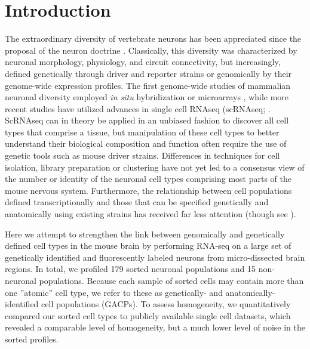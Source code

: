 \section*{Introduction}

The extraordinary diversity of vertebrate neurons has been appreciated since the proposal of the neuron doctrine \citep{Cajal_1888}. Classically, this diversity was characterized by neuronal morphology, physiology, and circuit connectivity, but increasingly, defined genetically through driver and reporter strains \citep{Gong_2003; Madisen_2009; Taniguchi_2011; Shima_2016} or genomically by their genome-wide expression profiles. The first genome-wide studies of mammalian neuronal diversity employed \textit{in situ} hybridization \citep{Lein_2006} or microarrays \citep{Sugino_2005; Doyle_2008}, while more recent studies have utilized advances in single cell RNAseq (scRNAseq; \citep{Zeisel_2015; Zeisel_2018; Tasic_2016; Tasic_2018; Paul_2017}. ScRNAseq can in theory be applied in an unbiased fashion to discover all cell types that comprise a tissue, but manipulation of these cell types to better understand their biological composition and function often require the use of genetic tools such as mouse driver strains. Differences in techniques for cell isolation, library preparation or clustering have not yet led to a consensus view of the number or identity of the neuronal cell types comprising most parts of the mouse nervous system. Furthermore, the relationship between cell populations defined transcriptionally and those that can be specified genetically and anatomically using existing strains has received far less attention (though see \citep{Tasic_2018}).    
 
Here we attempt to strengthen the link between genomically and genetically defined cell types in the mouse brain by performing RNA-seq on a large set of genetically identified and fluorescently labeled neurons from micro-dissected brain regions. In total, we profiled 179 sorted neuronal populations and 15 non-neuronal populations. Because each sample of sorted cells may contain more than one ”atomic” cell type, we refer to these as genetically- and anatomically-identified cell populations (GACPs). To assess homogeneity, we quantitatively compared our sorted cell types to publicly available single cell datasets, which revealed a comparable level of homogeneity, but a much lower level of noise in the sorted profiles.

